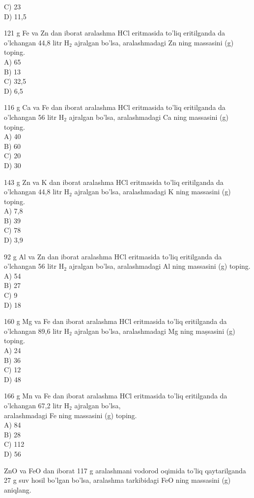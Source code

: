 C) 23\\
D) 11,5
  \item 121 g Fe va Zn dan iborat aralashma HCl eritmasida to'liq eritilganda da o'lchangan 44,8 litr $\mathrm{H}_{2}$ ajralgan bo'lsa, aralashmadagi Zn ning massasini (g) toping.\\
A) 65\\
B) 13\\
C) 32,5\\
D) 6,5
  \item 116 g Ca va Fe dan iborat aralashma HCl eritmasida to'liq eritilganda da o'lchangan 56 litr $\mathrm{H}_{2}$ ajralgan bo'lsa, aralashmadagi Ca ning massasini (g) toping.\\
A) 40\\
B) 60\\
C) 20\\
D) 30
  \item 143 g Zn va K dan iborat aralashma HCl eritmasida to'liq eritilganda da o'lchangan 44,8 litr $\mathrm{H}_{2}$ ajralgan bo'lsa, aralashmadagi K ning massasini (g) toping.\\
A) 7,8\\
B) 39\\
C) 78\\
D) 3,9
  \item 92 g Al va Zn dan iborat aralashma HCl eritmasida to'liq eritilganda da o'lchangan 56 litr $\mathrm{H}_{2}$ ajralgan bo'lsa, aralashmadagi Al ning massasini (g) toping.\\
A) 54\\
B) 27\\
C) 9\\
D) 18
  \item 160 g Mg va Fe dan iborat aralashma HCl eritmasida to'liq eritilganda da o'lchangan 89,6 litr $\mathrm{H}_{2}$ ajralgan bo'lsa, aralashmadagi Mg ning maṣsasini (g) toping.\\
A) 24\\
B) 36\\
C) 12\\
D) 48
  \item 166 g Mn va Fe dan iborat aralashma HCl eritmasida to'liq eritilganda da o'lchangan 67,2 litr $\mathrm{H}_{2}$ ajralgan bo'lsa,\\
aralashmadagi Fe ning massasini (g) toping.\\
A) 84\\
B) 28\\
C) 112\\
D) 56
  \item ZnO va FeO dan iborat 117 g aralashmani vodorod oqimida to'liq qaytarilganda 27 g suv hosil bo'lgan bo'lsa, aralashma tarkibidagi FeO ning massasini (g) aniqlang.\\

